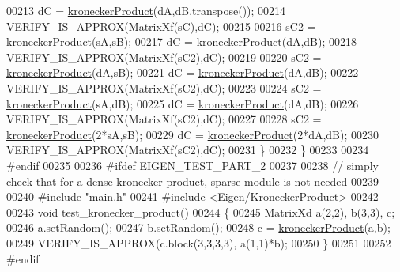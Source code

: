 \begin{DoxyCode}
00213     dC = \hyperlink{namespace_eigen_aedd4b7cd1e324ed0769cac2701f4d050}{kroneckerProduct}(dA,dB.transpose());
00214     VERIFY\_IS\_APPROX(MatrixXf(sC),dC);
00215     
00216     sC2 = \hyperlink{namespace_eigen_aedd4b7cd1e324ed0769cac2701f4d050}{kroneckerProduct}(sA,sB);
00217     dC = \hyperlink{namespace_eigen_aedd4b7cd1e324ed0769cac2701f4d050}{kroneckerProduct}(dA,dB);
00218     VERIFY\_IS\_APPROX(MatrixXf(sC2),dC);
00219     
00220     sC2 = \hyperlink{namespace_eigen_aedd4b7cd1e324ed0769cac2701f4d050}{kroneckerProduct}(dA,sB);
00221     dC = \hyperlink{namespace_eigen_aedd4b7cd1e324ed0769cac2701f4d050}{kroneckerProduct}(dA,dB);
00222     VERIFY\_IS\_APPROX(MatrixXf(sC2),dC);
00223     
00224     sC2 = \hyperlink{namespace_eigen_aedd4b7cd1e324ed0769cac2701f4d050}{kroneckerProduct}(sA,dB);
00225     dC = \hyperlink{namespace_eigen_aedd4b7cd1e324ed0769cac2701f4d050}{kroneckerProduct}(dA,dB);
00226     VERIFY\_IS\_APPROX(MatrixXf(sC2),dC);
00227     
00228     sC2 = \hyperlink{namespace_eigen_aedd4b7cd1e324ed0769cac2701f4d050}{kroneckerProduct}(2*sA,sB);
00229     dC = \hyperlink{namespace_eigen_aedd4b7cd1e324ed0769cac2701f4d050}{kroneckerProduct}(2*dA,dB);
00230     VERIFY\_IS\_APPROX(MatrixXf(sC2),dC);
00231   \}
00232 \}
00233 
00234 \textcolor{preprocessor}{#endif}
00235 
00236 \textcolor{preprocessor}{#ifdef EIGEN\_TEST\_PART\_2}
00237 
00238 \textcolor{comment}{// simply check that for a dense kronecker product, sparse module is not needed}
00239 
00240 \textcolor{preprocessor}{#include "main.h"}
00241 \textcolor{preprocessor}{#include <Eigen/KroneckerProduct>}
00242 
00243 \textcolor{keywordtype}{void} test\_kronecker\_product()
00244 \{
00245   MatrixXd a(2,2), b(3,3), c;
00246   a.setRandom();
00247   b.setRandom();
00248   c = \hyperlink{namespace_eigen_aedd4b7cd1e324ed0769cac2701f4d050}{kroneckerProduct}(a,b);
00249   VERIFY\_IS\_APPROX(c.block(3,3,3,3), a(1,1)*b);
00250 \}
00251 
00252 \textcolor{preprocessor}{#endif}
\end{DoxyCode}

